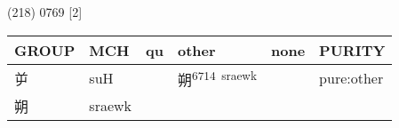 \documentclass[14pt,a4paper]{scrartcl}
\begin{document}
(218) 0769 {[}2{]}

\begin{longtable}[c]{@{}llllll@{}}
\toprule
\begin{minipage}[b]{0.14\columnwidth}\raggedright\strut
GROUP
\strut\end{minipage} &
\begin{minipage}[b]{0.14\columnwidth}\raggedright\strut
MCH
\strut\end{minipage} &
\begin{minipage}[b]{0.14\columnwidth}\raggedright\strut
qu
\strut\end{minipage} &
\begin{minipage}[b]{0.14\columnwidth}\raggedright\strut
other
\strut\end{minipage} &
\begin{minipage}[b]{0.14\columnwidth}\raggedright\strut
none
\strut\end{minipage} &
\begin{minipage}[b]{0.14\columnwidth}\raggedright\strut
PURITY
\strut\end{minipage}\tabularnewline
\midrule
\endhead
\begin{minipage}[t]{0.14\columnwidth}\raggedright\strut
屰
\strut\end{minipage} &
\begin{minipage}[t]{0.14\columnwidth}\raggedright\strut
suH
\strut\end{minipage} &
\begin{minipage}[t]{0.14\columnwidth}\raggedright\strut
\strut\end{minipage} &
\begin{minipage}[t]{0.14\columnwidth}\raggedright\strut
朔\textsuperscript{6714~sraewk}
\strut\end{minipage} &
\begin{minipage}[t]{0.14\columnwidth}\raggedright\strut
\strut\end{minipage} &
\begin{minipage}[t]{0.14\columnwidth}\raggedright\strut
pure:other
\strut\end{minipage}\tabularnewline
\begin{minipage}[t]{0.14\columnwidth}\raggedright\strut
朔
\strut\end{minipage} &
\begin{minipage}[t]{0.14\columnwidth}\raggedright\strut
sraewk
\strut\end{minipage} &
\begin{minipage}[t]{0.14\columnwidth}\raggedright\strut

\end{minipage}
\end{longtable}
\end{document}
